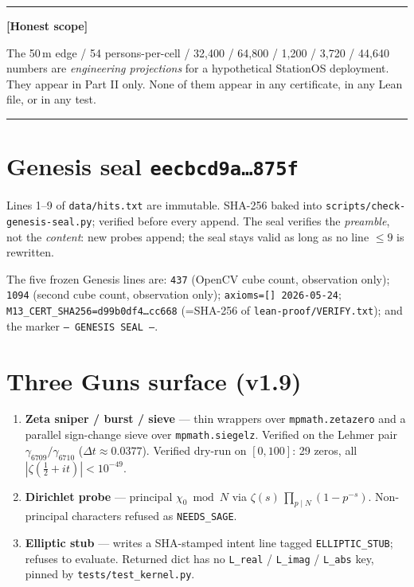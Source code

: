 \documentclass[11pt,letterpaper]{article}
\newenvironment{honest}%
  {\par\medskip\noindent\rule{\linewidth}{0.5pt}\par\nopagebreak\textbf{[Honest scope]}\par\nopagebreak\small}%
  {\par\nopagebreak\normalsize\rule{\linewidth}{0.5pt}\par\medskip}
\begin{document}
\begin{honest}
The 50\,m edge / 54 persons-per-cell / 32{,}400 / 64{,}800 / 1{,}200 /
3{,}720 / 44{,}640 numbers are \emph{engineering projections} for a
hypothetical StationOS deployment. They appear in Part II only. None of
them appear in any certificate, in any Lean file, or in any test.
\end{honest}

\section{Genesis seal \texttt{eecbcd9a\ldots 875f}}
\label{sec:seal}

Lines 1--9 of \texttt{data/hits.txt} are immutable. SHA-256 baked into
\texttt{scripts/check-genesis-seal.py}; verified before every append.
The seal verifies the \emph{preamble}, not the \emph{content}: new probes
append; the seal stays valid as long as no line $\le 9$ is rewritten.

The five frozen Genesis lines are: \texttt{437} (OpenCV cube count, observation only); \texttt{1094} (second cube count, observation only); \texttt{axioms=[] 2026-05-24}; \texttt{M13\_CERT\_SHA256=d99b0df4\ldots cc668} (=SHA-256 of \texttt{lean-proof/VERIFY.txt}); and the marker \texttt{--- GENESIS SEAL ---}.

\section{Three Guns surface (v1.9)}
\label{sec:three-guns}

\begin{enumerate}
  \item \textbf{Zeta sniper / burst / sieve} --- thin wrappers over \texttt{mpmath.zetazero} and a parallel sign-change sieve over \texttt{mpmath.siegelz}. Verified on the Lehmer pair $\gamma_{6709}/\gamma_{6710}$ ($\Delta t \approx 0.0377$). Verified dry-run on $[0, 100]$: 29 zeros, all $|\zeta(\tfrac12 + it)| < 10^{-49}$.
  \item \textbf{Dirichlet probe} --- principal $\chi_0 \bmod N$ via $\zeta(s)\,\prod_{p \mid N}(1 - p^{-s})$. Non-principal characters refused as \texttt{NEEDS\_SAGE}.
  \item \textbf{Elliptic stub} --- writes a SHA-stamped intent line tagged \texttt{ELLIPTIC\_STUB}; refuses to evaluate. Returned dict has no \texttt{L\_real} / \texttt{L\_imag} / \texttt{L\_abs} key, pinned by \texttt{tests/test\_kernel.py}.
\end{enumerate}
\end{document}
